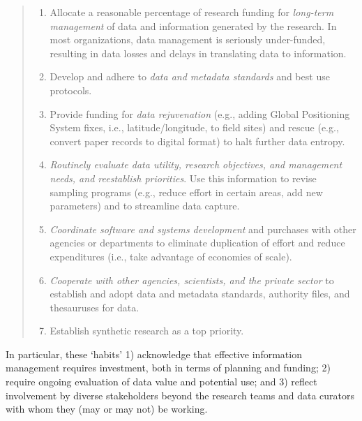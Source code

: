 \documentclass[paper]{ijdc-v9}
\begin{document}
\begin{quote}
\begin{enumerate}
\def\labelenumi{\arabic{enumi}.}
\item
  Allocate a reasonable percentage of research funding for
  \emph{long-term management} of data and information generated by the
  research. In most organizations, data management is seriously
  under-funded, resulting in data losses and delays in translating data
  to information.
\item
  Develop and adhere to \emph{data and metadata standards} and best use
  protocols.
\item
  Provide funding for \emph{data rejuvenation} (e.g., adding Global
  Positioning System fixes, i.e., latitude/longitude, to field sites)
  and rescue (e.g., convert paper records to digital format) to halt
  further data entropy.
\item
  \emph{Routinely evaluate data utility, research objectives, and
  management needs, and reestablish priorities}. Use this information to
  revise sampling programs (e.g., reduce effort in certain areas, add
  new parameters) and to streamline data capture.
\item
  \emph{Coordinate software and systems development} and purchases with
  other agencies or departments to eliminate duplication of effort and
  reduce expenditures (i.e., take advantage of economies of scale).
\item
  \emph{Cooperate with other agencies, scientists, and the private
  sector} to establish and adopt data and metadata standards, authority
  files, and thesauruses for data.
\item
  Establish synthetic research as a top priority. \autocite[pp 434.
  Emphasis added.]{michener_role_1999}
\end{enumerate}
\end{quote}

In particular, these `habits' 1) acknowledge that effective information
management requires investment, both in terms of planning and funding;
2) require ongoing evaluation of data value and potential use; and 3)
reflect involvement by diverse stakeholders beyond the research teams
and data curators with whom they (may or may not) be working.
\end{document}
